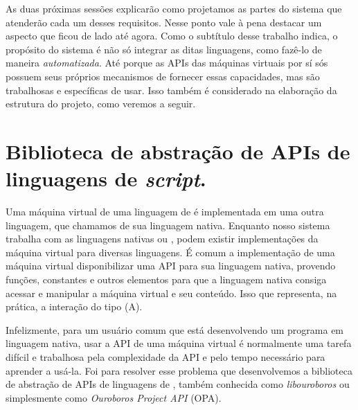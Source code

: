     As duas próximas sessões explicarão como projetamos as partes do sistema
    que atenderão cada um desses requisitos. Nesse ponto vale à pena destacar
    um aspecto que ficou de lado até agora. Como o subtítulo desse trabalho
    indica, o propósito do sistema é não só integrar as ditas linguagens, como
    fazê-lo de maneira \textit{automatizada}. Até porque as APIs das máquinas
    virtuais por sí sós possuem seus próprios mecanismos de fornecer essas
    capacidades, mas são trabalhosas e específicas de usar. Isso também é
    considerado na elaboração da estrutura do projeto, como veremos a seguir.

  \section{Biblioteca de abstração de APIs de linguagens de \emph{script}.}
  \label{sec:estrutura:opa}
  
    Uma máquina virtual de uma linguagem de \script{} é implementada em uma outra
    linguagem, que chamamos de sua linguagem nativa. Enquanto nosso sistema trabalha
    com as linguagens nativas \C{} ou \CXX{}, podem existir implementações da máquina
    virtual para diversas linguagens. É comum a implementação de uma máquina virtual
    disponibilizar uma API para sua linguagem nativa, provendo funções, constantes
    e outros elementos para que a linguagem nativa consiga acessar e manipular a
    máquina virtual e seu conteúdo. Isso que representa, na prática, a interação do
    tipo (A).

    Infelizmente, para um usuário comum que está desenvolvendo um programa em
    linguagem nativa, usar a API de uma máquina virtual é normalmente uma tarefa
    difícil e trabalhosa pela complexidade da API e pelo tempo necessário para
    aprender a usá-la. Foi para resolver esse problema que desenvolvemos a
    biblioteca de abstração de APIs de linguagens de \script{}, também conhecida
    como \textit{libouroboros} ou simplesmente como \emph{Ouroboros Project API}
    (OPA).
    
